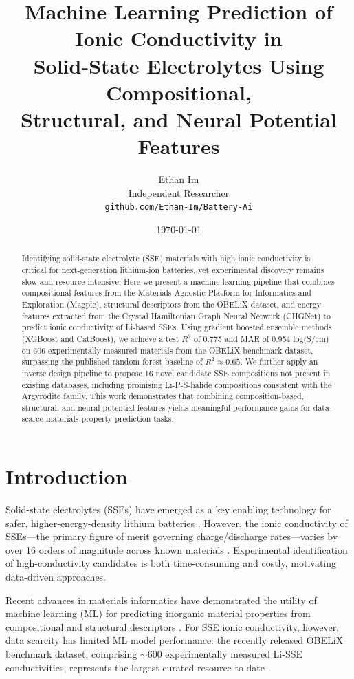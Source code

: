 \documentclass[12pt]{article}
\title{Machine Learning Prediction of Ionic Conductivity in\\
Solid-State Electrolytes Using Compositional,\\
Structural, and Neural Potential Features}
\author{Ethan Im\\
Independent Researcher\\
\texttt{github.com/Ethan-Im/Battery-Ai}}
\date{\today}
\begin{document}
\maketitle

\begin{abstract}
Identifying solid-state electrolyte (SSE) materials with high ionic conductivity is
critical for next-generation lithium-ion batteries, yet experimental discovery remains
slow and resource-intensive. Here we present a machine learning pipeline that combines
compositional features from the Materials-Agnostic Platform for Informatics and
Exploration (Magpie), structural descriptors from the OBELiX dataset, and energy
features extracted from the Crystal Hamiltonian Graph Neural Network (CHGNet) to
predict ionic conductivity of Li-based SSEs. Using gradient boosted ensemble methods
(XGBoost and CatBoost), we achieve a test $R^2$ of 0.775 and MAE of 0.954 log(S/cm)
on 606 experimentally measured materials from the OBELiX benchmark dataset,
surpassing the published random forest baseline of $R^2 \approx 0.65$.
We further apply an inverse design pipeline to propose 16 novel candidate SSE
compositions not present in existing databases, including promising Li-P-S-halide
compositions consistent with the Argyrodite family. This work demonstrates that
combining composition-based, structural, and neural potential features yields meaningful
performance gains for data-scarce materials property prediction tasks.
\end{abstract}

\section{Introduction}

Solid-state electrolytes (SSEs) have emerged as a key enabling technology for safer,
higher-energy-density lithium batteries \cite{janek2016solid}. However, the ionic
conductivity of SSEs---the primary figure of merit governing charge/discharge
rates---varies by over 16 orders of magnitude across known materials
\cite{therrien2025obelix}. Experimental identification of high-conductivity candidates
is both time-consuming and costly, motivating data-driven approaches.

Recent advances in materials informatics have demonstrated the utility of machine
learning (ML) for predicting inorganic material properties from compositional and
structural descriptors \cite{ward2016magpie, jain2013mp}. For SSE ionic conductivity,
however, data scarcity has limited ML model performance: the recently released OBELiX
benchmark dataset, comprising $\sim$600 experimentally measured Li-SSE conductivities,
represents the largest curated resource to date \cite{therrien2025obelix}.
\end{document}

